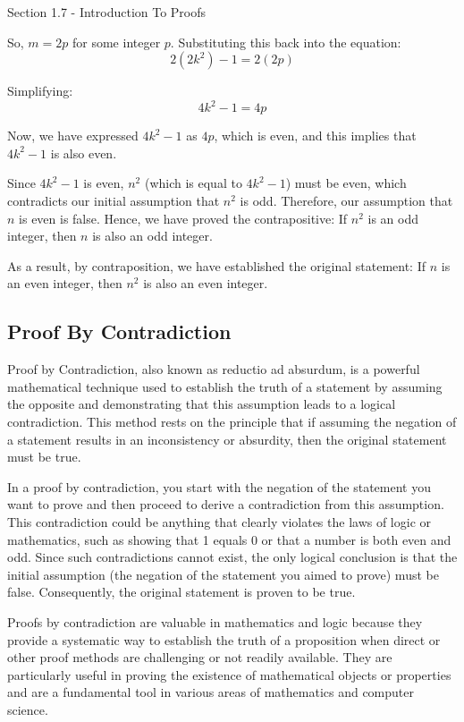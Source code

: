 \begin{notes}{Section 1.7 - Introduction To Proofs}
\begin{highlight}
        So, $m = 2p$ for some integer $p$. Substituting this back into the equation:
        \[2(2k^2) - 1 = 2(2p)\]
        
        Simplifying:
        \[4k^2 - 1 = 4p\]
        
        Now, we have expressed $4k^2 - 1$ as $4p$, which is even, and this implies that $4k^2 - 1$ is also even.
        
        Since $4k^2 - 1$ is even, $n^2$ (which is equal to $4k^2 - 1$) must be even, which contradicts our initial assumption that $n^2$ is odd. Therefore, our assumption that $n$ is even is false. 
        Hence, we have proved the contrapositive: If $n^2$ is an odd integer, then $n$ is also an odd integer.
        

        As a result, by contraposition, we have established the original statement: If $n$ is an even integer, then $n^2$ is also an even integer.
    \end{highlight}

    \subsection*{Proof By Contradiction}

    Proof by Contradiction, also known as reductio ad absurdum, is a powerful mathematical technique used to establish the truth of a statement by assuming the opposite and demonstrating that this 
    assumption leads to a logical contradiction. This method rests on the principle that if assuming the negation of a statement results in an inconsistency or absurdity, then the original statement 
    must be true.

    In a proof by contradiction, you start with the negation of the statement you want to prove and then proceed to derive a contradiction from this assumption. This contradiction could be anything 
    that clearly violates the laws of logic or mathematics, such as showing that 1 equals 0 or that a number is both even and odd. Since such contradictions cannot exist, the only logical conclusion 
    is that the initial assumption (the negation of the statement you aimed to prove) must be false. Consequently, the original statement is proven to be true.

    Proofs by contradiction are valuable in mathematics and logic because they provide a systematic way to establish the truth of a proposition when direct or other proof methods are challenging or 
    not readily available. They are particularly useful in proving the existence of mathematical objects or properties and are a fundamental tool in various areas of mathematics and computer science.


\end{notes}

